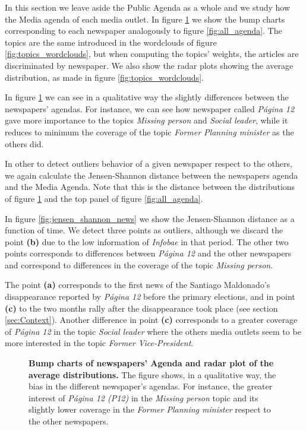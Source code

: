 \documentclass[10pt,letterpaper]{article}
\begin{document}
\par In this section we leave aside the Public Agenda as a whole and we study how the Media agenda of each media outlet. 
In figure \ref{fig:news_agenda} we show the bump charts corresponding to each newspaper analogously to figure \ref{fig:all_agenda}.
The topics are the same introduced in the wordclouds of figure \ref{fig:topics_wordclouds}, but when computing the topics' weights,  the articles are discriminated by newspaper. 
We also show the radar plots showing the average distribution, as made in figure \ref{fig:topics_wordclouds}. 
\par In figure \ref{fig:news_agenda} we can see in a qualitative way the slightly differences between the newspapers' agendas.
For instance, we can see how newspaper called \emph{P\'agina 12} gave more importance to the topics \emph{Missing person} and \emph{Social leader}, while it reduces to minimum the coverage of the topic  \emph{Former Planning minister} as the others did.


\par In other to detect outliers behavior of a given newspaper respect to the others, we again calculate the Jensen-Shannon distance between the newspapers agenda and the Media Agenda.
Note that this is the distance between the distributions of figure \ref{fig:news_agenda} and the top panel of figure \ref{fig:all_agenda}.
\par In figure \ref{fig:jensen_shannon_news} we show the Jensen-Shannon distance as a function of time.
We detect three points as outliers, although we discard the point \textbf{(b)} due to the low information of \emph{Infobae} in that period. 
The other two points corresponds to differences between \emph{P\'agina 12} and the other newspapers and correspond to differences in the coverage of the topic \emph{Missing person}.

\par The point \textbf{(a)} corresponds  to the first news of the Santiago Maldonado's disappearance  reported by \emph{P\'agina 12} before the primary elections, and in point \textbf{(c)} to  the two months rally after the disappearance took place (see section \ref{sec:Context}). Another difference in point \textbf{(c)} corresponds to a greater coverage of \emph{P\'agina 12} in the topic \emph{Social leader} where the others media outlets seem to be more interested in the topic \emph{Former Vice-President}.

\begin{figure}[h!]
\centering
\caption{\textbf{Bump charts of newspapers' Agenda and radar plot of the average distributions.} The figure shows, in a qualitative way, the bias in the different newspaper's agendas. For instance, the greater interest of \emph{P\'agina 12 (P12)} in the \emph{Missing person} topic and its slightly lower coverage in the \emph{Former Planning minister} respect to the other newspapers.}
\label{fig:news_agenda}
\end{figure}
\end{document}
